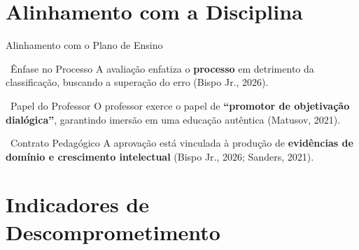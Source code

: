 \documentclass[xcolor=dvipsnames,table]{beamer}
\begin{document}
  \section{Alinhamento com a Disciplina}

  \begin{frame}{Alinhamento com o Plano de Ensino}
    \begin{block}{\faBookOpen\ Ênfase no Processo}
      A avaliação enfatiza o \textbf{processo} em detrimento da classificação, buscando a
      superação do erro (Bispo Jr., 2026).
    \end{block}
    \pause
    \begin{block}{\faGraduationCap\ Papel do Professor}
      O professor exerce o papel de \textbf{``promotor de objetivação dialógica''}, garantindo
      imersão em uma educação autêntica (Matusov, 2021).
    \end{block}
    \pause
    \begin{exampleblock}{\faFileAlt\ Contrato Pedagógico}
      A aprovação está vinculada à produção de \textbf{evidências de domínio e crescimento
      intelectual} (Bispo Jr., 2026; Sanders, 2021).
    \end{exampleblock}
  \end{frame}

  \section{Indicadores de Descomprometimento}
\end{document}
